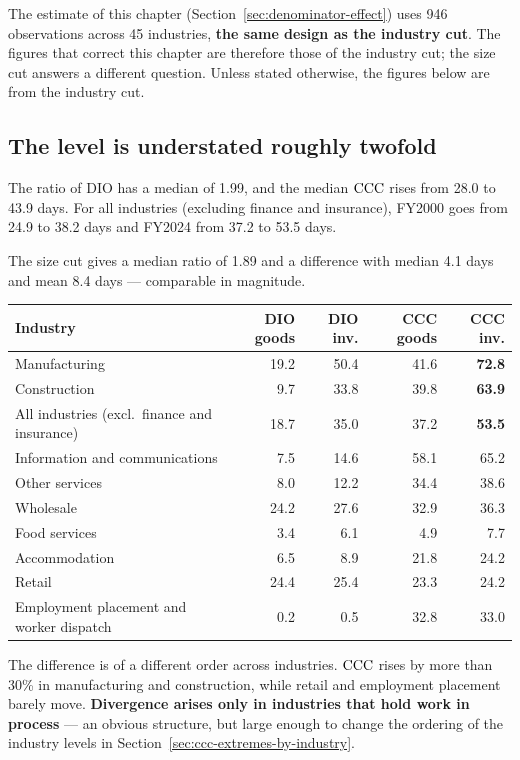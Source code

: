 The estimate of this chapter (Section~\ref{sec:denominator-effect}) uses 946 observations across
45 industries, \textbf{the same design as the industry cut}. The figures that correct this chapter
are therefore those of the industry cut; the size cut answers a different question. Unless stated
otherwise, the figures below are from the industry cut.

\subsection{The level is understated roughly twofold}

The ratio of $\mathrm{DIO}$ has a median of 1.99, and the median $\mathrm{CCC}$ rises from 28.0 to 43.9
days. For all industries (excluding finance and insurance), FY2000 goes from 24.9 to 38.2 days
and FY2024 from 37.2 to 53.5 days.

The size cut gives a median ratio of 1.89 and a difference with median 4.1 days and mean 8.4 days
— comparable in magnitude.

\begin{center}
\begin{tabular}{@{}lrrrr@{}}
\toprule
Industry & DIO goods & DIO inv. & CCC goods & CCC inv. \\
\midrule
Manufacturing & 19.2 & 50.4 & 41.6 & \textbf{72.8} \\
Construction & 9.7 & 33.8 & 39.8 & \textbf{63.9} \\
All industries (excl.\ finance and insurance) & 18.7 & 35.0 & 37.2 & \textbf{53.5} \\
Information and communications & 7.5 & 14.6 & 58.1 & 65.2 \\
Other services & 8.0 & 12.2 & 34.4 & 38.6 \\
Wholesale & 24.2 & 27.6 & 32.9 & 36.3 \\
Food services & 3.4 & 6.1 & 4.9 & 7.7 \\
Accommodation & 6.5 & 8.9 & 21.8 & 24.2 \\
Retail & 24.4 & 25.4 & 23.3 & 24.2 \\
Employment placement and worker dispatch & 0.2 & 0.5 & 32.8 & 33.0 \\
\bottomrule
\end{tabular}
\label{tab:inventory-scope}
\end{center}

The difference is of a different order across industries. $\mathrm{CCC}$ rises by more than 30\% in
manufacturing and construction, while retail and employment placement barely move.
\textbf{Divergence arises only in industries that hold work in process} — an obvious structure,
but large enough to change the ordering of the industry levels in
Section~\ref{sec:ccc-extremes-by-industry}.

